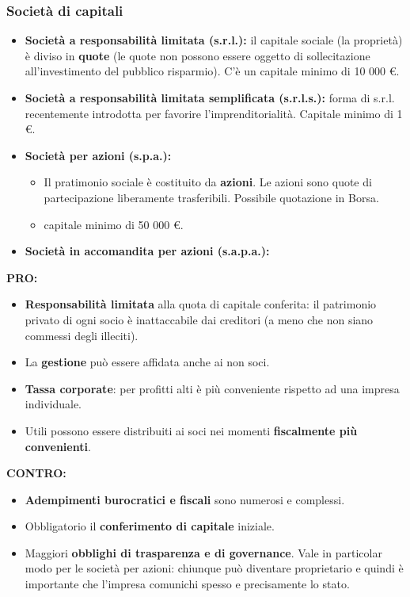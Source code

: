 \documentclass[../main.tex]{subfiles}
\begin{document}
\subsubsection{Società di capitali}

\begin{itemize}
\item \textbf{Società a responsabilità limitata (s.r.l.):} il capitale sociale (la proprietà) è diviso in \textbf{quote} (le quote non possono essere oggetto di sollecitazione all'investimento del pubblico risparmio). C'è un capitale minimo di 10 000 \euro.

\item \textbf{Società a responsabilità limitata semplificata (s.r.l.s.):} forma di s.r.l. recentemente introdotta per favorire l'imprenditorialità. Capitale minimo di 1 \euro.

\item \textbf{Società per azioni (s.p.a.):}

\begin{itemize}
\item
Il pratimonio sociale è costituito da \textbf{azioni}. Le azioni sono quote di partecipazione liberamente trasferibili. Possibile quotazione in Borsa.
\item capitale minimo di 50 000 \euro.
\end{itemize}

\item \textbf{Società in accomandita per azioni (s.a.p.a.):}

\end{itemize}

\textbf{PRO:}
\begin{itemize}
\item \textbf{Responsabilità limitata} alla quota di capitale conferita: il patrimonio privato di ogni socio è inattaccabile dai creditori (a meno che non siano commessi degli illeciti).
\item La \textbf{gestione} può essere affidata anche ai non soci.
\item \textbf{Tassa corporate}: per profitti alti è più conveniente rispetto ad una impresa individuale.
\item Utili possono essere distribuiti ai soci nei momenti \textbf{fiscalmente più convenienti}.

\end{itemize}

\textbf{CONTRO:}
\begin{itemize}
\item \textbf{Adempimenti burocratici e fiscali} sono numerosi e complessi.
\item Obbligatorio il \textbf{conferimento di capitale} iniziale.
\item Maggiori \textbf{obblighi di trasparenza e di governance}. Vale in particolar modo per le società per azioni: chiunque può diventare proprietario e quindi è importante che l'impresa comunichi spesso e precisamente lo stato.

\end{itemize}
\end{document}
